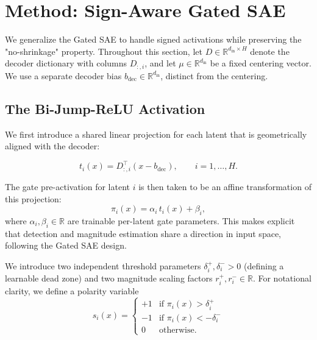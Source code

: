 \documentclass{article}
\newcommand{\R}{\mathbb{R}}
\begin{document}

\section{Method: Sign-Aware Gated SAE}

We generalize the Gated SAE to handle signed activations while preserving the "no-shrinkage" property. Throughout this section, let $D \in \mathbb{R}^{d_{\text{in}} \times H}$ denote the decoder dictionary with columns $D_{:,i}$, and let $\mu \in \mathbb{R}^{d_{\text{in}}}$ be a fixed centering vector. We use a separate decoder bias $b_{\text{dec}} \in \mathbb{R}^{d_{\text{in}}}$, distinct from the centering.

\subsection{The Bi-Jump-ReLU Activation}
\label{sec:bijumprelu}

We first introduce a shared linear projection for each latent that is geometrically aligned with the decoder:

\begin{equation}
    t_i(x) = D_{:,i}^\top (x - b_{\text{dec}}), \qquad i = 1,\dots,H.
\end{equation}

The gate pre-activation for latent $i$ is then taken to be an affine transformation of this projection:
\begin{equation}
    \pi_i(x) = \alpha_i\, t_i(x) + \beta_i,
\end{equation}
where $\alpha_i, \beta_i \in \mathbb{R}$ are trainable per-latent gate parameters. This makes explicit that detection and magnitude estimation share a direction in input space, following the Gated SAE design.

We introduce two independent threshold parameters $\delta_i^+, \delta_i^- > 0$ (defining a learnable dead zone) and two magnitude scaling factors $r_i^+, r_i^- \in \R$. For notational clarity, we define a polarity variable
\begin{equation}
    s_i(x) =
    \begin{cases}
        +1 & \text{if } \pi_i(x) > \delta_i^+ \\
        -1 & \text{if } \pi_i(x) < -\delta_i^- \\
        0 & \text{otherwise.}
    \end{cases}
\end{equation}
\end{document}
